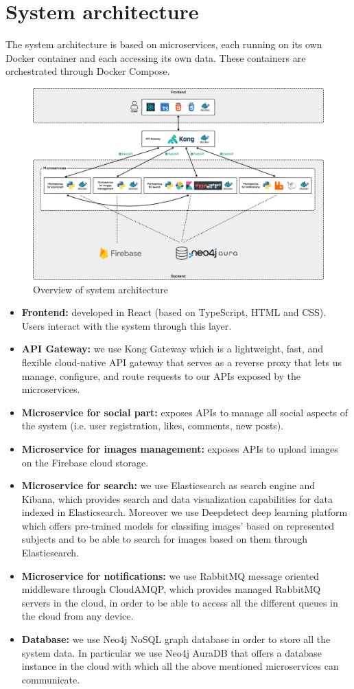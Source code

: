 \documentclass[11pt, a4paper]{article}
\begin{document}
\section{System architecture}
The system architecture is based on microservices, each running on its own Docker container and each accessing its own data. These containers are orchestrated through Docker Compose.
\begin{figure}[H]
    \centering
    \includegraphics[width=1\textwidth]{images/architecture.png}
    \caption{Overview of system architecture}
\end{figure}
\begin{itemize}
    \item \textbf{Frontend:} developed in React (based on TypeScript, HTML and CSS). Users interact with the system through this layer.
    \item \textbf{API Gateway:} we use Kong Gateway which is a lightweight, fast, and flexible cloud-native API gateway that serves as a reverse proxy that lets us manage, configure, and route requests to our APIs exposed by the microservices.
    \item \textbf{Microservice for social part:} exposes APIs to manage all social aspects of the system (i.e. user registration, likes, comments, new posts).
    \item \textbf{Microservice for images management:} exposes APIs to upload images on the Firebase cloud storage.
    \item \textbf{Microservice for search:} we use Elasticsearch as search engine and Kibana, which provides search and data visualization capabilities for data indexed in Elasticsearch. Moreover we use Deepdetect deep learning platform which offers pre-trained models for classifing images' based on represented subjects and to be able to search for images based on them through Elasticsearch.
    \item \textbf{Microservice for notifications:} we use RabbitMQ message oriented middleware through CloudAMQP, which provides managed RabbitMQ servers in the cloud, in order to be able to access all the different queues in the cloud from any device.
    \item \textbf{Database:} we use Neo4j NoSQL graph database in order to store all the system data. In particular we use Neo4j AuraDB that offers a database instance in the cloud with which all the above mentioned microservices can communicate. 
\end{itemize}
\end{document}
